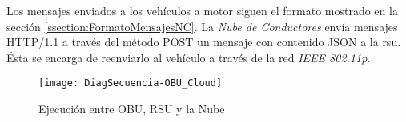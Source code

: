 Los mensajes enviados a los vehículos a motor siguen el formato mostrado en la sección
\ref{ssection:FormatoMensajesNC}. La \emph{Nube de Conductores} envía mensajes HTTP/1.1
a través del método POST un mensaje con contenido JSON a la \gls{rsu}. Ésta se encarga
de reenviarlo al vehículo a través de la red \emph{IEEE 802.11p}.

\begin{figure}[H]
	\begin{center}
		\texttt{[image: DiagSecuencia-OBU\_Cloud]}
		\caption{Ejecución entre OBU, RSU y la Nube}
		\label{fig:DiagSecuencia-OBU_Cloud}
	\end{center}
\end{figure}

